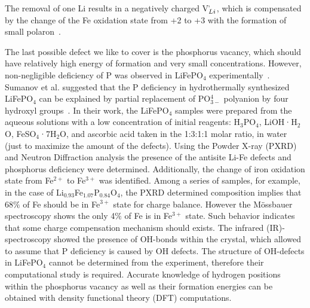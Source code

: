 
The removal of one Li results in a negatively charged V$^{\mapstochar}_{Li}$, which is compensated by the change of the Fe oxidation state from +2 to +3 with the formation of small polaron~\cite{axmann2009nonstoichiometric}. 

The last possible defect we like to cover is the phosphorus vacancy, which should have relatively high energy of formation and very small concentrations. However, non-negligible deficiency of P  was observed in LiFePO$_4$ experimentally~\cite{amisse2015singular}. Sumanov et al. suggested that the P deficiency in hydrothermally synthesized LiFePO$_4$ can be explained by partial replacement of PO$^4_{3-}$ polyanion by four hydroxyl groups~\cite{sumanov2019hydrotriphylites}. In their work, the LiFePO$_4$ samples were prepared from the aqueous solutions with a low concentration of initial reagents: H$_3$PO$_4$, LiOH·H$_2$O, FeSO$_4$·7H$_2$O, and ascorbic acid taken in the 1:3:1:1 molar ratio, in water (just to maximize the amount of the defects). Using the Powder X-ray (PXRD) and Neutron Diffraction analysis the presence of the antisite Li-Fe defects and phosphorus deficiency were determined. Additionally, the change of iron oxidation state from Fe$^{2+}$ to Fe$^{3+}$ was identified. Among a series of samples, for example, in the case of Li$_{0.93}$Fe$_{1.07}$P$_{0.84}$O$_4$, the PXRD determined composition implies that 68$\%$ of Fe should be in Fe$^{3+}$ state for charge balance. However the M{\"o}ssbauer spectroscopy shows the only 4$\%$ of Fe is in Fe$^{3+}$ state. Such behavior indicates that some charge compensation mechanism should exists. The infrared (IR)-spectroscopy showed the presence of OH-bonds within the crystal, which allowed to assume that P deficiency is caused by OH defects. The structure of OH-defects in LiFePO$_4$ cannot be determined from the experiment, therefore their computational study is required. Accurate knowledge of hydrogen positions within the phosphorus vacancy as well as their formation energies can be obtained with density functional theory (DFT) computations. 



